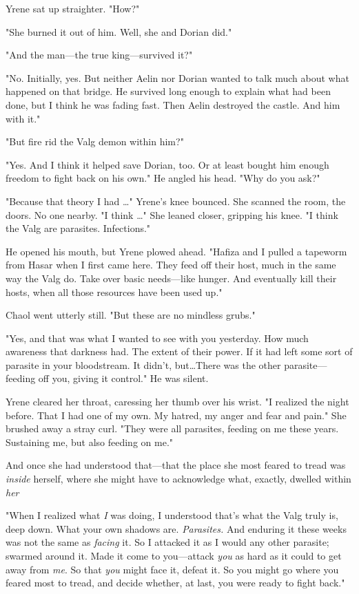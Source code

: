 Yrene sat up straighter.
"How?"

"She burned it out of him.
Well, she and Dorian did."

"And the man---the true king---survived it?"

"No.
Initially, yes.
But neither Aelin nor Dorian wanted to talk much about what happened on that bridge.
He survived long enough to explain what had been done, but I think he was fading fast.
Then Aelin destroyed the castle.
And him with it."

"But fire rid the Valg demon within him?"

"Yes.
And I think it helped save Dorian, too.
Or at least bought him enough freedom to fight back on his own."
He angled his head.
"Why do you ask?"

"Because that theory I had \ldots" Yrene's knee bounced.
She scanned the room, the doors.
No one nearby.
"I think \ldots" She leaned closer, gripping his knee.
"I think the Valg are parasites.
Infections."

He opened his mouth, but Yrene plowed ahead.
"Hafiza and I pulled a tapeworm from Hasar when I first came here.
They feed off their host, much in the same way the Valg do.
Take over basic needs---like hunger.
And eventually kill their hosts, when all those resources have been used up."

Chaol went utterly still.
"But these are no mindless grubs."

"Yes, and that was what I wanted to see with you yesterday.
How much awareness that darkness had.
The extent of their power.
If it had left some sort of parasite in your bloodstream.
It didn't, but\ldots There was the other parasite--- feeding off you, giving it control."
He was silent.

Yrene cleared her throat, caressing her thumb over his wrist.
"I realized the night before.
That I had one of my own.
My hatred, my anger and fear and pain."
She brushed away a stray curl.
"They were all parasites, feeding on me these years.
Sustaining me, but also feeding on me."

And once she had understood that---that the place she most feared to tread was \emph{inside} herself, where she might have to acknowledge what, exactly, dwelled within \emph{her} 

"When I realized what \emph{I} was doing, I understood that's what the Valg truly is, deep down.
What your own shadows are.
\emph{Parasites.}
And enduring it these weeks was not the same as \emph{facing} it.
So I attacked it as I would any other parasite; swarmed around it.
Made it come to you---attack \emph{you} as hard as it could to get away from \emph{me}.
So that \emph{you} might face it, defeat it.
So you might go where you feared most to tread, and decide whether, at last, you were ready to fight back."

